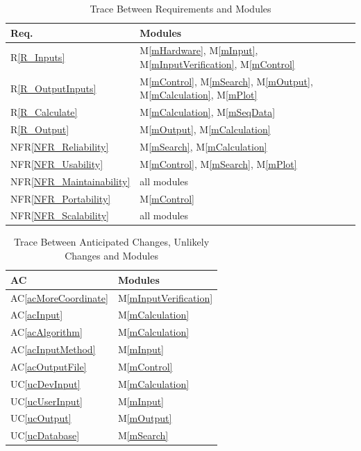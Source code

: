 \documentclass[12pt, titlepage]{article}
\newcommand{\acref}[1]{AC\ref{#1}}
\newcommand{\uref}[1]{UC\ref{#1}}
\newcommand{\mref}[1]{M\ref{#1}}
\newcommand{\rref}[1]{R\ref{#1}}
\newcommand{\nfrref}[1]{NFR\ref{#1}}
\begin{document}
\begin{table}[H]
\centering
\begin{tabular}{p{} p{}}
\toprule
\textbf{Req.} & \textbf{Modules}\\
\midrule
\rref{R_Inputs} & \mref{mHardware}, \mref{mInput}, \mref{mInputVerification}, \mref{mControl}\\
\rref{R_OutputInputs} & \mref{mControl}, \mref{mSearch}, \mref{mOutput}, \mref{mCalculation},  \mref{mPlot}\\
\rref{R_Calculate} & \mref{mCalculation}, \mref{mSeqData}\\
\rref{R_Output} & \mref{mOutput}, \mref{mCalculation}\\
\nfrref{NFR_Reliability} & \mref{mSearch}, \mref{mCalculation}\\
\nfrref{NFR_Usability} & \mref{mControl},  \mref{mSearch}, \mref{mPlot}\\
\nfrref{NFR_Maintainability} & all modules\\
\nfrref{NFR_Portability} & \mref{mControl}\\
\nfrref{NFR_Scalability}  & all modules\\

\bottomrule
\end{tabular}
\caption{Trace Between Requirements and Modules}
\label{TblRT}
\end{table}

\begin{table}[H]
\centering
\begin{tabular}{p{} p{}}
\toprule
\textbf{AC} & \textbf{Modules}\\
\midrule
\acref{acMoreCoordinate} & \mref{mInputVerification}\\
\acref{acInput} & \mref{mCalculation}\\
\acref{acAlgorithm} & \mref{mCalculation}\\
\acref{acInputMethod} & \mref{mInput}\\
\acref{acOutputFile} & \mref{mControl} \\
\uref{ucDevInput} & \mref{mCalculation}\\
\uref{ucUserInput} & \mref{mInput}\\
\uref{ucOutput} & \mref{mOutput}\\
\uref{ucDatabase} & \mref{mSearch}\\
\bottomrule
\end{tabular}
\caption{Trace Between Anticipated Changes, Unlikely Changes and Modules}
\label{TblACUCT}
\end{table}
\end{document}

